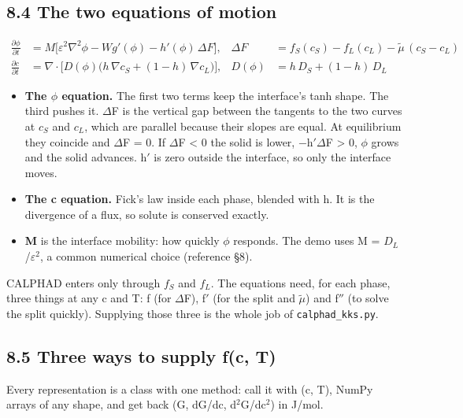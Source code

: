 \documentclass[12pt,a4paper]{article}
\begin{document}
\subsection*{8.4 The two equations of motion}
\begin{align*}
\frac{\partial\phi}{\partial t} &= M\bigl[\varepsilon^2\nabla^2\phi - W g'(\phi) - h'(\phi)\,\Delta F\bigr],
 & \Delta F &= f_S(c_S) - f_L(c_L) - \tilde{\mu}\,(c_S - c_L)\\
\frac{\partial c}{\partial t} &= \nabla\cdot\bigl[D(\phi)\bigl(h\,\nabla c_S + (1-h)\,\nabla c_L\bigr)\bigr],
 & D(\phi) &= h\,D_S + (1-h)\,D_L
\end{align*}
\begin{itemize}
\item \textbf{The \(\phi\) equation.} The first two terms keep the interface's tanh shape. The third pushes it. \(\Delta\)F is the vertical gap between the tangents to the two curves at \(c_{S}\) and \(c_{L}\), which are parallel because their slopes are equal. At equilibrium they coincide and \(\Delta\)F = 0. If \(\Delta\)F < 0 the solid is lower, \(-\)h\(' \Delta\)F > 0, \(\phi\) grows and the solid advances. h\('\) is zero outside the interface, so only the interface moves.
\item \textbf{The c equation.} Fick's law inside each phase, blended with h. It is the divergence of a flux, so solute is conserved exactly.
\item \textbf{M} is the interface mobility: how quickly \(\phi\) responds. The demo uses M = \(D_{L}\)/\(\varepsilon ^{2}\), a common numerical choice (reference \S{}8).
\end{itemize}
CALPHAD enters only through \(f_{S}\) and \(f_{L}\). The equations need, for each phase, three things at any c and T: f (for \(\Delta\)F), f\('\) (for the split and \(\tilde{\mu}\)) and f\(''\) (to solve the split quickly). Supplying those three is the whole job of \texttt{calphad\_\allowbreak{}kks.\allowbreak{}py}.


\subsection*{8.5 Three ways to supply f(c, T)}
Every representation is a class with one method: call it with (c, T), NumPy arrays of any shape, and get back (G, dG/dc, d\(^{2}\)G/dc\(^{2}\)) in J/mol.
\end{document}
